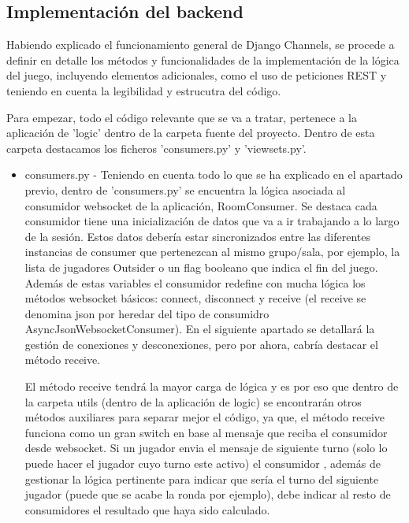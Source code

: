 \subsection{Implementación del backend}

Habiendo explicado el funcionamiento general de Django Channels, se procede a definir en detalle los métodos y funcionalidades 
de la implementación de la lógica del juego, incluyendo elementos adicionales, como el uso de peticiones REST y teniendo en cuenta 
la legibilidad y estrucutra del código.

Para empezar, todo el código relevante que se va a tratar, pertenece a la aplicación de 'logic' dentro de la carpeta fuente del proyecto.
Dentro de esta carpeta destacamos los ficheros 'consumers.py' y 'viewsets.py'.

\begin{itemize}
	\item consumers.py - Teniendo en cuenta todo lo que se ha explicado en el apartado previo, dentro de 'consumers.py' se encuentra la lógica asociada
	 	  al consumidor websocket de la aplicación, RoomConsumer. Se destaca cada consumidor tiene una inicialización de datos que va a ir trabajando
		  a lo largo de la sesión. Estos datos debería estar sincronizados entre las diferentes instancias de consumer que pertenezcan 
		  al mismo grupo/sala, por ejemplo, la lista de jugadores Outsider o un flag booleano que indica el fin del juego. Además de estas variables el consumidor 
		  redefine con mucha lógica los métodos websocket básicos: connect, disconnect y receive (el receive se denomina json por heredar del tipo de consumidro 
		  AsyncJsonWebsocketConsumer). En el siguiente apartado se detallará la gestión de conexiones y desconexiones, pero por ahora, cabría destacar el método receive.

		  El método receive tendrá la mayor carga de lógica y es por eso que dentro de la carpeta utils (dentro de la aplicación de logic) se encontrarán
		  otros métodos auxiliares para separar mejor el código, ya que, el método receive funciona como un gran switch en base al mensaje que reciba el
		  consumidor desde websocket. Si un jugador envia el mensaje de siguiente turno (solo lo puede hacer el jugador cuyo turno este activo) el consumidor 
		  , además de gestionar la lógica pertinente para indicar que sería el turno del siguiente jugador (puede que se acabe la ronda por ejemplo), debe indicar
		  al resto de consumidores el resultado que haya sido calculado.


\end{itemize}
